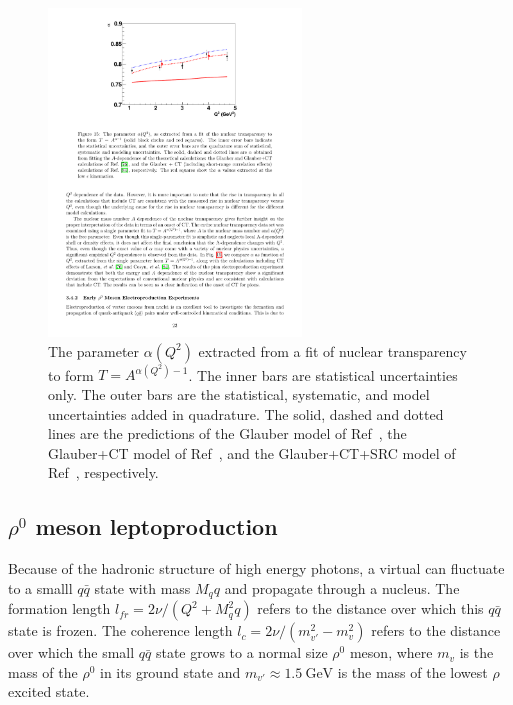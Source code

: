 \begin{figure}[!h]
    \centering
    \includegraphics[width=0.6\textwidth]{chap2/pion_electroproduction_transparency_A_dependence.pdf}
    \caption{
            The parameter $\alpha(Q^2)$ extracted from a fit of nuclear
            transparency to form $T=A^{\alpha(Q^2)-1}$.
            The inner bars are statistical uncertainties only.
            The outer bars are the statistical, systematic, and model
            uncertainties added in quadrature.
            The solid, dashed and dotted lines are the predictions of
            the Glauber model of Ref~\cite{Larson_2006},
            the Glauber+CT model of Ref~\cite{Larson_2006},
            and the Glauber+CT+SRC model of Ref~\cite{Cosyn_2006},
            respectively.
            }
    \label{fig:pion_electroproduction_transparency_A_dependence}
\end{figure}

\subsection{$\rho^0$ meson leptoproduction}
Because of the hadronic structure of high energy photons,
a virtual can fluctuate to a smalll $q\bar{q}$ state with mass $M_qq$ and
propagate through a nucleus.
The formation length $l_{fr}=2\nu/(Q^2+M^2_qq)$ refers to the distance over
which this $q\bar{q}$ state is frozen.
The coherence length $l_c=2\nu/(m^2_{v'}-m^2_{v})$ refers to the distance over
which the small $q\bar{q}$ state grows to a normal size $\rho^0$ meson,
where $m_v$ is the mass of the $\rho^0$ in its ground state
and $m_{v'}\approx\SI{1.5}{\giga\electronvolt}$ is the mass of the lowest $\rho$
excited state.



